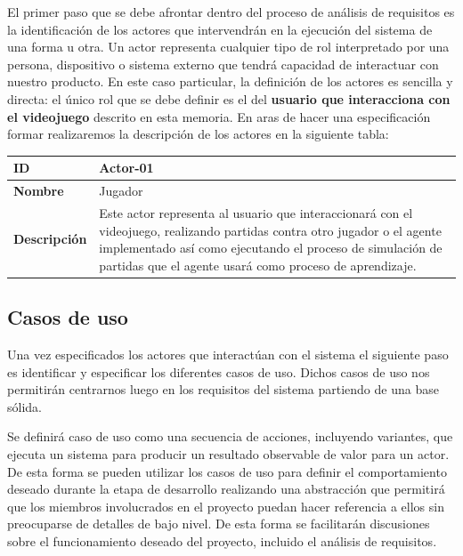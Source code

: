 El primer paso que se debe afrontar dentro del proceso de análisis de requisitos es la identificación de los actores que intervendrán en la ejecución del sistema de una forma u otra. Un actor representa cualquier tipo de rol interpretado por una persona, dispositivo o sistema externo que tendrá capacidad de interactuar con nuestro producto. En este caso particular, la definición de los actores es sencilla y directa: el único rol que se debe definir es el del \textbf{usuario que interacciona con el videojuego} descrito en esta memoria. En aras de hacer una especificación formar realizaremos la descripción de los actores en la siguiente tabla:



\begin{center}
	\begin{tabular}{ | p{3cm} | p{10cm} | } 
		\hline
		\textbf{ID} & Actor-01 \\
		\hline 
		\textbf{Nombre} & Jugador \\ 
		\hline
		\textbf{Descripción} & 
		Este actor representa al usuario que interaccionará con el videojuego, realizando partidas contra otro jugador o el agente implementado así como ejecutando el proceso de simulación de partidas que el agente usará como proceso de aprendizaje.\\
		\hline 
	\end{tabular}
\end{center}

\subsection{Casos de uso}


Una vez especificados los actores que interactúan con el sistema el siguiente paso es identificar y especificar los diferentes casos de uso. Dichos casos de uso nos permitirán centrarnos luego en los requisitos del sistema partiendo de una base sólida.


\bigskip

Se definirá caso de uso como \cite{modelado_referencia} una secuencia de acciones, incluyendo variantes, que ejecuta un sistema para producir un resultado observable de valor para un actor. De esta forma se pueden utilizar los casos de uso para definir el comportamiento deseado durante la etapa de desarrollo realizando una abstracción que permitirá que los miembros involucrados en el proyecto puedan hacer referencia a ellos sin preocuparse de detalles de bajo nivel. De esta forma se facilitarán discusiones sobre el funcionamiento deseado del proyecto, incluido el análisis de requisitos.

